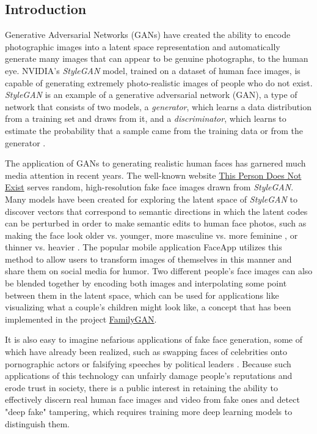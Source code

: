 \documentclass[11pt, letterpaper]{article}
\begin{document}
\begin{multicols}{2}
  \section{Introduction}

  Generative Adversarial Networks (GANs) have created the ability to
  encode photographic images into a latent space representation and
  automatically generate many images that can appear to be genuine
  photographs, to the human eye. NVIDIA's
  \emph{StyleGAN}\cite{stylegan} model, trained on a dataset of human
  face images, is capable of generating extremely photo-realistic
  images of people who do not exist. \emph{StyleGAN} is an example of
  a generative adversarial network (GAN), a type of network that
  consists of two models, a \emph{generator}, which learns a data
  distribution from a training set and draws from it, and a
  \emph{discriminator}, which learns to estimate the probability that
  a sample came from the training data or from the generator
  \cite{goodfellow2014generative}.

  The application of GANs to generating realistic human faces has
  garnered much media attention in recent years. The well-known
  website \href{https://thispersondoesnotexist.com/}{This Person Does
    Not Exist} serves random, high-resolution fake face images drawn
  from \emph{StyleGAN}. Many models have been created for exploring
  the latent space of \emph{StyleGAN} to discover vectors that
  correspond to semantic directions in which the latent codes can be
  perturbed in order to make semantic edits to human face photos, such
  as making the face look older vs. younger, more masculine vs. more
  feminine \cite{shen2020interpreting}, or thinner vs. heavier
  \cite{pinnimty2020transforming}. The popular mobile application
  FaceApp utilizes this method to allow users to transform images of
  themselves in this manner and share them on social media for
  humor. Two different people's face images can also be blended
  together by encoding both images and interpolating some point
  between them in the latent space, which can be used for applications
  like visualizing what a couple's children might look like, a concept
  that has been implemented in the project
  \href{https://medium.com/swlh/familygan-generating-a-childs-face-using-his-parents-394d8face6a4}{FamilyGAN}.

  It is also easy to imagine nefarious applications of fake face
  generation, some of which have already been realized, such as
  swapping faces of celebrities onto pornographic actors or falsifying
  speeches by political leaders \cite{nguyen2020deep}. Because such
  applications of this technology can unfairly damage people's
  reputations and erode trust in society, there is a public interest
  in retaining the ability to effectively discern real human face
  images and video from fake ones and detect "deep fake" tampering,
  which requires training more deep learning models to distinguish
  them.


\end{multicols}
\end{document}
